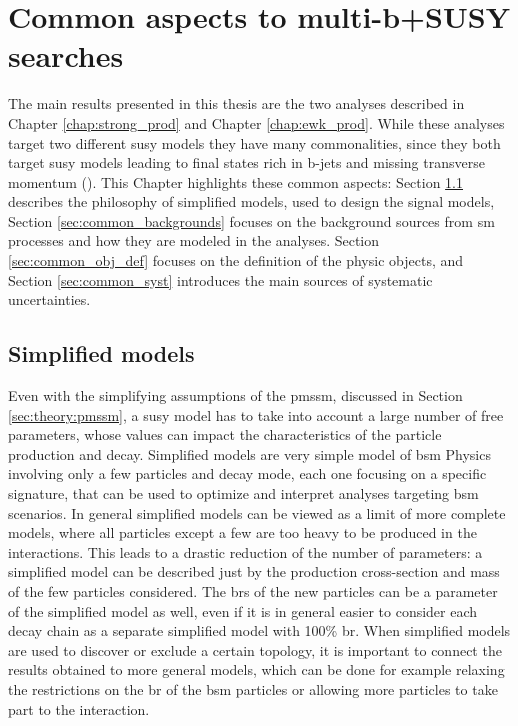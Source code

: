\chapter{Common aspects to multi-b+\met SUSY searches}
\label{chap:multib_general}

The main results presented in this thesis are the two analyses described in Chapter \ref{chap:strong_prod} and Chapter \ref{chap:ewk_prod}. While these analyses target two different \gls{susy} models they have many commonalities, since they both target \gls{susy} models leading to final states rich in b-jets and missing transverse momentum (\met). This Chapter highlights these common aspects: Section \ref{sec:simplified_models} describes the philosophy of simplified models, used to design the signal models, Section \ref{sec:common_backgrounds} focuses on the background sources from \gls{sm} processes and how they are modeled in the analyses. 
Section \ref{sec:common_obj_def} focuses on the definition of the physic objects, and Section \ref{sec:common_syst} introduces the main sources of 
systematic uncertainties.

\section{Simplified models}
\label{sec:simplified_models}

Even with the simplifying assumptions of the \gls{pmssm}, discussed in Section \ref{sec:theory:pmssm}, a \gls{susy} model has to take into account a large number of free parameters, whose values can impact the characteristics of the particle production and decay. 
Simplified models \cite{Alves:2011wf} are very simple model of \gls{bsm} Physics involving only a few particles and decay mode, 
each one focusing on a specific signature, that can be used to optimize and interpret analyses targeting \gls{bsm} scenarios. 
In general simplified models can be viewed as a limit of more complete models, where all particles except a few are too heavy to be 
produced in the interactions. This leads to a drastic reduction of the number of parameters: a simplified model can be described just by the production cross-section and mass of the few particles considered. 
The \glspl{br} of the new particles can be a parameter of the simplified model as well, even if it is in general easier to consider each decay chain as a separate simplified model with 100\% \gls{br}.
When simplified models are used to discover or exclude a certain topology, it is important to connect the results obtained to more general models, 
which can be done for example relaxing the restrictions on the \gls{br} of the \gls{bsm} particles or allowing more particles to take part to the interaction.

